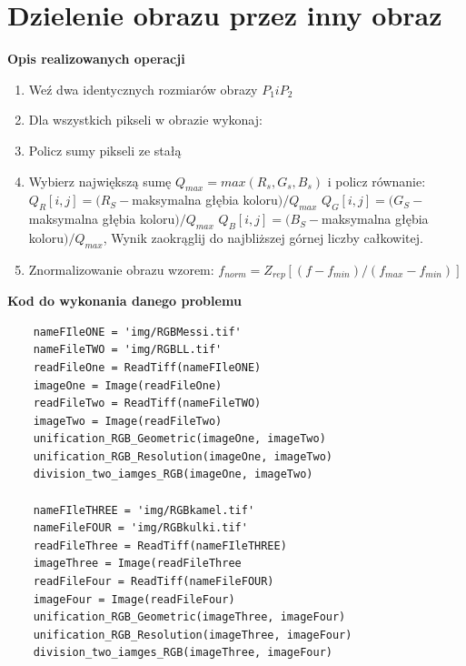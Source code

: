 \documentclass[magisterska,openany]{pracadypl}
\begin{document}
\section{Dzielenie obrazu przez inny obraz}

\textbf{\Large Opis realizowanych operacji}
\begin{enumerate}
\item Weź dwa identycznych rozmiarów obrazy $P_1 i P_2$
\item Dla wszystkich pikseli w obrazie wykonaj:  
\item Policz sumy pikseli ze stałą
\item Wybierz największą sumę $Q_{max}=max(R_s,G_s,B_s)$ i policz równanie:
\newline $Q_R[i,j]=(R_S-$maksymalna głębia koloru$)/Q_{max}$
\newline $Q_G[i,j]=(G_S-$maksymalna głębia koloru$)/Q_{max}$
\newline $Q_B[i,j]=(B_S-$maksymalna głębia koloru$)/Q_{max}$,
\newline Wynik zaokrąglij do najbliższej górnej liczby całkowitej.
\item Znormalizowanie obrazu wzorem:
\newline $f_{norm}=Z_{rep}[(f-f_{min})/(f_{max}-f_{min})]$
\end{enumerate}

\vspace{0.5cm}
\textbf{\Large Kod do wykonania danego problemu}
\lstset{language=Python}
\vspace{0.25cm}
\begin{lstlisting}
	nameFIleONE = 'img/RGBMessi.tif'
	nameFileTWO = 'img/RGBLL.tif'
	readFileOne = ReadTiff(nameFIleONE)
	imageOne = Image(readFileOne)
	readFileTwo = ReadTiff(nameFileTWO)
	imageTwo = Image(readFileTwo)
	unification_RGB_Geometric(imageOne, imageTwo)
	unification_RGB_Resolution(imageOne, imageTwo)
	division_two_iamges_RGB(imageOne, imageTwo)
	
	nameFIleTHREE = 'img/RGBkamel.tif'
	nameFileFOUR = 'img/RGBkulki.tif'
	readFileThree = ReadTiff(nameFIleTHREE)
	imageThree = Image(readFileThree
	readFileFour = ReadTiff(nameFileFOUR)
	imageFour = Image(readFileFour)
	unification_RGB_Geometric(imageThree, imageFour)
	unification_RGB_Resolution(imageThree, imageFour)
	division_two_iamges_RGB(imageThree, imageFour)

\end{lstlisting}
\end{document}
